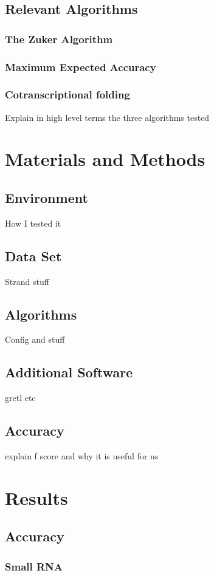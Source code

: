 \documentclass[12pt, a4paper]{article}
\begin{document}
\subsection{Relevant Algorithms}
\subsubsection{The Zuker Algorithm}
\subsubsection{Maximum Expected Accuracy}
\subsubsection{Cotranscriptional folding}
Explain in high level terms the three algorithms tested

\section{Materials and Methods}
\subsection{Environment}
How I tested it
\subsection{Data Set}
Strand stuff
\subsection{Algorithms}
Config and stuff
\subsection{Additional Software}
gretl etc
\subsection{Accuracy}
explain f score and why it is useful for us

\section{Results}
\subsection{Accuracy}
\subsubsection{Small RNA}
\end{document}

